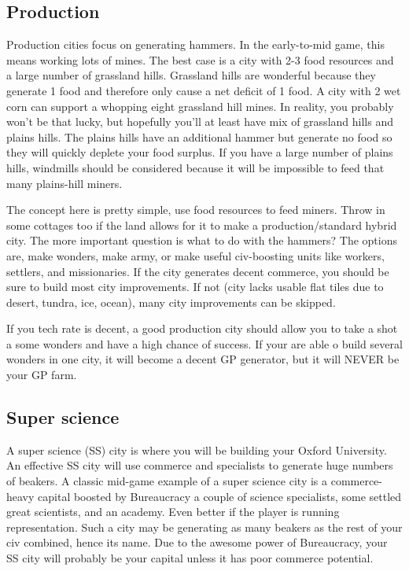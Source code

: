 \documentclass[10pt]{article}
\begin{document}
\subsection*{Production}

Production cities focus on generating hammers. In the early-to-mid game, this means
working lots of mines. The best case is a city with 2-3 food resources and a large
number of grassland hills. Grassland hills are wonderful because they generate 1 food
and therefore only cause a net deficit of 1 food. A city with 2 wet corn can support
a whopping eight grassland hill mines. In reality, you probably won't be that lucky,
but hopefully you'll at least have mix of grassland hills and plains hills. The plains
hills have an additional hammer but generate no food so they will quickly deplete
your food surplus. If you have a large number of plains hills, windmills should be
considered because it will be impossible to feed that many plains-hill miners.

The concept here is pretty simple, use food resources to feed miners. Throw in some
cottages too if the land allows for it to make a production/standard hybrid city.
The more important question is what to do with the hammers? The options are, make
wonders, make army, or make useful civ-boosting units like workers, settlers, and missionaries.
If the city generates decent commerce, you should be sure to
build most city improvements. If not (city lacks usable flat tiles due to desert,
tundra, ice, ocean), many city improvements can be skipped.

If you tech rate is decent, a good production city should allow you to take a shot
a some wonders and have a high chance of success. If your are able o build several
wonders in one city, it will become a decent GP generator, but it will NEVER be your
GP farm.

\subsection*{Super science}

A super science (SS) city is where you will be building your Oxford
University. An effective SS city will use commerce and specialists to
generate huge numbers of beakers. A classic mid-game example of a
super science city is a commerce-heavy capital boosted by Bureaucracy
a couple of science specialists, some settled great scientists, and an
academy. Even better if the player is running representation. Such a
city may be generating as many beakers as the rest of your civ
combined, hence its name. Due to the awesome power of Bureaucracy, your
SS city will probably be your capital unless it has poor commerce
potential.
\end{document}
